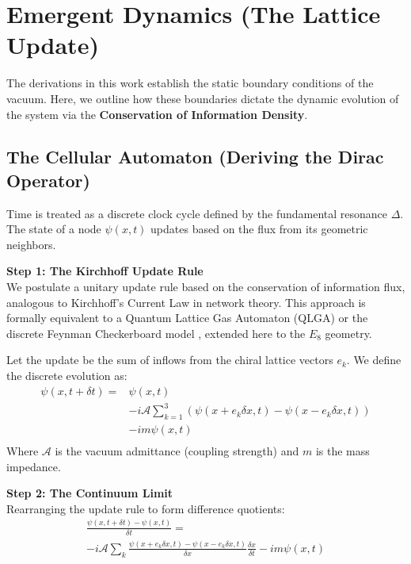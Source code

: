 
\section{Emergent Dynamics (The Lattice Update)}
\label{sec:EmergentDynamics}

The derivations in this work establish the static boundary conditions of the vacuum. Here, we outline how these boundaries dictate the dynamic evolution of the system via the \textbf{Conservation of Information Density}.

\subsection{The Cellular Automaton (Deriving the Dirac Operator)}
Time is treated as a discrete clock cycle defined by the fundamental resonance $\Delta$. The state of a node $\psi(x, t)$ updates based on the flux from its geometric neighbors.

\textbf{Step 1: The Kirchhoff Update Rule} \\

We postulate a unitary update rule based on the conservation of information flux, analogous to Kirchhoff's Current Law in network theory. This approach is formally equivalent to a Quantum Lattice Gas Automaton (QLGA)\cite{meyer_quantum_1996} or the discrete Feynman Checkerboard model \cite{feynman_quantum_1965}, extended here to the $E_8$ geometry.

Let the update be the sum of inflows from the chiral lattice vectors $e_k$. We define the discrete evolution as:
\begin{equation}
\begin{split}
    \psi(x, t+\delta t) =& \psi(x, t) \\
    & - i \mathcal{A} \sum_{k=1}^{3} \left( \psi(x + e_k \delta x, t) - \psi(x - e_k \delta x, t) \right) \\
    & - i m \psi(x, t) \\
\end{split}
\label{eq:KirchhoffUpdateRule}
\end{equation}
Where $\mathcal{A}$ is the vacuum admittance (coupling strength) and $m$ is the mass impedance.

\textbf{Step 2: The Continuum Limit} \\
Rearranging the update rule to form difference quotients:
\begin{equation}
\begin{split}
    \frac{\psi(x, t+\delta t) - \psi(x,t)}{\delta t} = \\
    -i \mathcal{A} \sum_{k} \frac{\psi(x + e_k \delta x, t) - \psi(x - e_k \delta x, t)}{\delta x} \frac{\delta x}{\delta t} 
    - i m \psi(x, t)
\end{split}
\end{equation}

